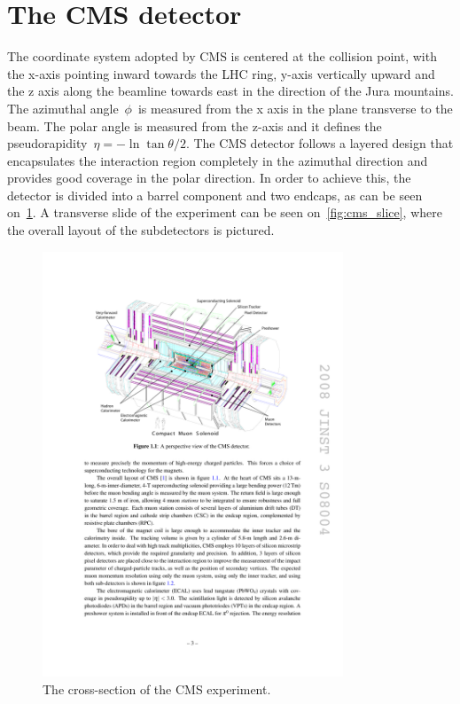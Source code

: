 \section{The CMS detector}
The coordinate system adopted by CMS is centered at the collision point, with the x-axis pointing inward towards the LHC ring, y-axis vertically upward and the z axis along the beamline towards east in the direction of the Jura mountains. The azimuthal angle~$\phi$~is measured from the x axis in the plane transverse to the beam. The polar angle is measured from the z-axis and it defines the pseudorapidity~$\eta = -\ln{\tan{\theta/2}}$. The CMS detector follows a layered design that encapsulates the interaction region completely in the azimuthal direction and provides good coverage in the polar direction. In order to achieve this, the detector is divided into a barrel component and two endcaps, as can be seen on~\cref{fig:cms_experiment}. A transverse slide of the experiment can be seen on~\cref{fig:cms_slice}, where the overall layout of the subdetectors is pictured. 

\begin{figure}
\begin{centering}
\includegraphics[width=0.8\textwidth]{figures/exp/cms.pdf}
\caption{The cross-section of the CMS experiment.}
\label{fig:cms_experiment}
\end{centering}
\end{figure}

